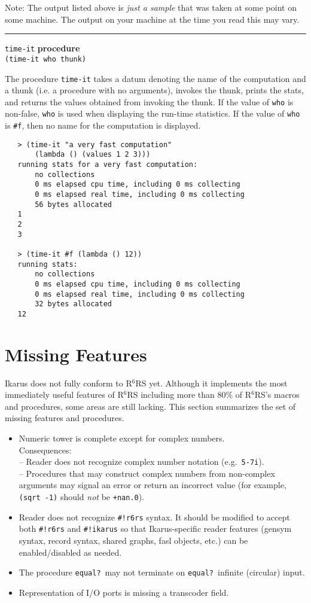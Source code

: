\documentclass[onecolumn, 12pt, twoside, openright, dvipdfm]{book}
\makeatletter
\newcommand{\rnrs}[1]{R$^{\mathrm{#1}}$RS}
\newcommand{\idxdefun}[3]{
\vspace{1ex}
\rule{\textwidth}{2pt}
{\index{#1@\texttt{#2}}\label{#1}{\Large\texttt{#2}} \hfill \textbf{#3}}\\
}
\newcommand{\defun}[2]{\idxdefun{#1}{#1}{#2}}
\makeatother
\begin{document}
Note: The  output listed above is \emph{just a sample} that was
taken at some point on some machine.  The output on your
machine at the time you read this may vary.

\newpage
\defun{time-it}{procedure}
\texttt{(time-it who thunk)}

The procedure \texttt{time-it} takes a datum denoting the name of
the computation and a thunk (i.e. a
procedure with no arguments), invokes the thunk, prints the stats,
and returns the values obtained from invoking the thunk.  
If the value of \texttt{who} is non-false, \texttt{who}
is used when displaying the run-time statistics.  If the value of
\texttt{who} is \texttt{\#f}, then no name for the computation is
displayed.

\begin{verbatim}
   > (time-it "a very fast computation"
       (lambda () (values 1 2 3)))
   running stats for a very fast computation:
       no collections
       0 ms elapsed cpu time, including 0 ms collecting
       0 ms elapsed real time, including 0 ms collecting
       56 bytes allocated
   1
   2
   3

   > (time-it #f (lambda () 12))
   running stats:
       no collections
       0 ms elapsed cpu time, including 0 ms collecting
       0 ms elapsed real time, including 0 ms collecting
       32 bytes allocated
   12
\end{verbatim}

\chapter{Missing Features}

Ikarus does not fully conform to \rnrs{6} yet.  Although it
implements the most immediately useful features of \rnrs{6}
including more than 80\% of \rnrs{6}'s macros and procedures, some
areas are still lacking.  This section summarizes the set of
missing features and procedures.  


\begin{itemize}
\item Numeric tower is complete except for complex numbers.\\
  Consequences: \\
  -- Reader does not recognize complex number notation
    (e.g.~\texttt{5-7i}).\\
  -- Procedures that may construct complex numbers from non-complex
    arguments may signal an error or return an incorrect value
    (for example, \texttt{(sqrt -1)} should \emph{not} be \texttt{+nan.0}).
\item Reader does not recognize \texttt{\#!r6rs} syntax.  It should
be modified to accept both \texttt{\#!r6rs} and \texttt{\#!ikarus}
so that Ikarus-specific reader features (gensym syntax, record
syntax, shared graphs, fasl objects, etc.) can be enabled/disabled as needed.
\item The procedure \texttt{equal?}\ may not terminate on
\texttt{equal?}\ infinite (circular) input.
\item Representation of I/O ports is missing a transcoder field.
\end{itemize}
\newpage
\end{document}
